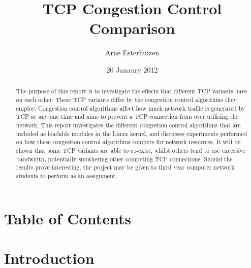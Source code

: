 \documentclass[11pt,a4paper,twocolumn]{article}
\begin{document}
\title{
	TCP Congestion Control Comparison
}
\author{
	Arne Esterhuizen
}
\date{20 Janaury 2012}
\maketitle

\begin{abstract}
The purpose of this report is to investigate the effects that different TCP variants have on each other.
These TCP variants differ by the congestion control algorithms they employ. Congestion control algorithms affect
how much network traffic is generated by TCP at any one time and aims to prevent a TCP connection from over utilising
the network. This report investigates the different congestion control algorithms that are included as loadable
modules in the Linux kernel, and discusses experiments performed on how these congestion control algorithms compete
for network resources. It will be shown that some TCP variants are able to co-exist, whilst others tend to 
use excessive bandwidth, potentially smothering other competing TCP connections.
Should the results prove interesting, the project may be given to third year computer network students to 
perform as an assignment.
\end{abstract}

\section{Table of Contents}

\section{Introduction}
\label{sec:intro}
\end{document}
